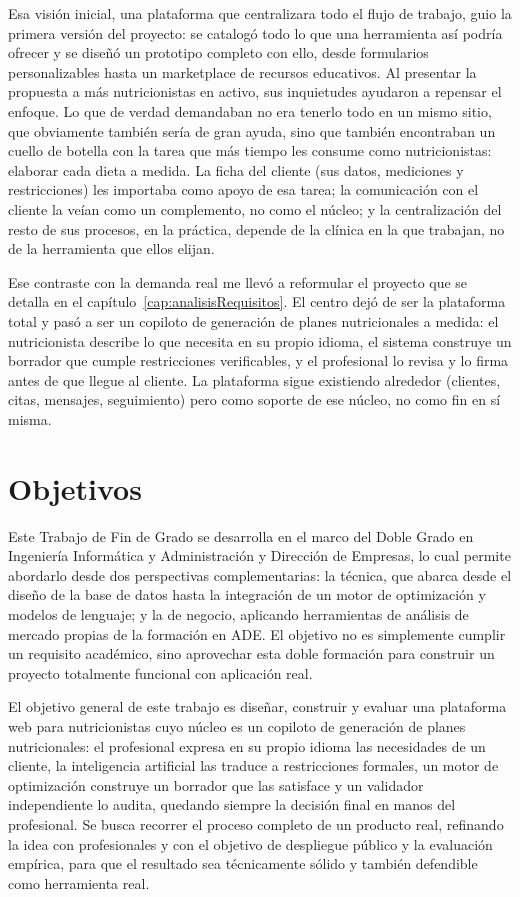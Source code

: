 Esa visión inicial, una plataforma que centralizara todo el flujo de trabajo, guio la primera versión del proyecto: se catalogó todo lo que una herramienta así podría ofrecer y se diseñó un prototipo completo con ello, desde formularios personalizables hasta un marketplace de recursos educativos. Al presentar la propuesta a más nutricionistas en activo, sus inquietudes ayudaron a repensar el enfoque. Lo que de verdad demandaban no era tenerlo todo en un mismo sitio, que obviamente también sería de gran ayuda, sino que también encontraban un cuello de botella con la tarea que más tiempo les consume como nutricionistas: elaborar cada dieta a medida. La ficha del cliente (sus datos, mediciones y restricciones) les importaba como apoyo de esa tarea; la comunicación con el cliente la veían como un complemento, no como el núcleo; y la centralización del resto de sus procesos, en la práctica, depende de la clínica en la que trabajan, no de la herramienta que ellos elijan.

Ese contraste con la demanda real me llevó a reformular el proyecto que se detalla en el capítulo~\ref{cap:analisisRequisitos}. El centro dejó de ser la plataforma total y pasó a ser un copiloto de generación de planes nutricionales a medida: el nutricionista describe lo que necesita en su propio idioma, el sistema construye un borrador que cumple restricciones verificables, y el profesional lo revisa y lo firma antes de que llegue al cliente. La plataforma sigue existiendo alrededor (clientes, citas, mensajes, seguimiento) pero como soporte de ese núcleo, no como fin en sí misma.


\section{Objetivos}
Este Trabajo de Fin de Grado se desarrolla en el marco del Doble Grado en Ingeniería Informática y Administración y Dirección de Empresas, lo cual permite abordarlo desde dos perspectivas complementarias: la técnica, que abarca desde el diseño de la base de datos hasta la integración de un motor de optimización y modelos de lenguaje; y la de negocio, aplicando herramientas de análisis de mercado propias de la formación en ADE. El objetivo no es simplemente cumplir un requisito académico, sino aprovechar esta doble formación para construir un proyecto totalmente funcional con aplicación real.

El objetivo general de este trabajo es diseñar, construir y evaluar una plataforma web para nutricionistas cuyo núcleo es un copiloto de generación de planes nutricionales: el profesional expresa en su propio idioma las necesidades de un cliente, la inteligencia artificial las traduce a restricciones formales, un motor de optimización construye un borrador que las satisface y un validador independiente lo audita, quedando siempre la decisión final en manos del profesional. Se busca recorrer el proceso completo de un producto real, refinando la idea con profesionales y con el objetivo de despliegue público y la evaluación empírica, para que el resultado sea técnicamente sólido y también defendible como herramienta real.

